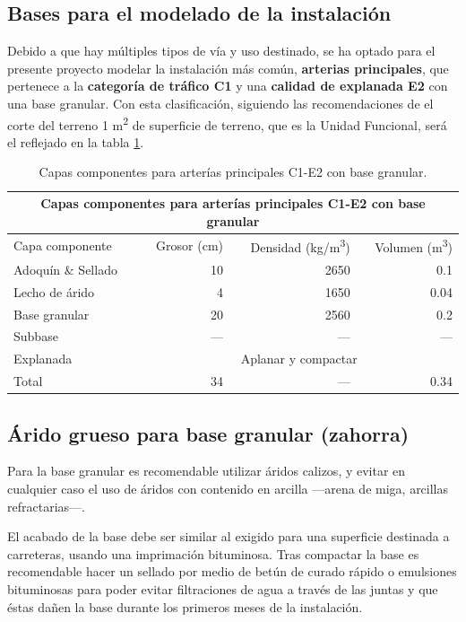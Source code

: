 \subsection{Bases para el modelado de la instalación}

Debido a que hay múltiples tipos de vía y uso destinado, se ha optado para el presente proyecto modelar la instalación más común, \textbf{arterias principales}, que pertenece a la \textbf{categoría de tráfico C1} y una \textbf{calidad de explanada E2} con una base granular. Con esta clasificación, siguiendo las recomendaciones de \cite{euroadoquinc} el corte del terreno 1 \si{m^2} de superficie de terreno, que es la Unidad Funcional, será el reflejado en la tabla \ref{cortedelterreno}.

\begin{table}[!htb]
\centering
\begin{tabular}{lrrr}
\toprule
\multicolumn{4}{c}{Capas componentes para arterías principales C1-E2 con base granular}\\
\midrule
Capa componente & Grosor (\si{cm}) & Densidad (\si{kg/m^3}) & Volumen (\si{m^3})\\
\midrule
Adoquín \& Sellado & 10 & 2650 & 0.1\\
Lecho de árido & 4 & 1650 & 0.04\\
Base granular & 20 & 2560 & 0.2\\
Subbase & — & — & —\\
Explanada & \multicolumn{3}{c}{Aplanar y compactar}\\
\midrule
Total & 34 & — & 0.34\\
\bottomrule
\end{tabular}
\caption{Capas componentes para arterías principales C1-E2 con base granular.}
\label{cortedelterreno}
\end{table}

\subsection{Árido grueso para base granular (zahorra)}

Para la base granular es recomendable utilizar áridos calizos, y evitar en cualquier caso el uso de áridos con contenido en arcilla —arena de miga, arcillas refractarias—.

El acabado de la base debe ser similar al exigido para una superficie destinada a carreteras, usando una imprimación bituminosa. Tras compactar la base es recomendable hacer un sellado por medio de betún de curado rápido o emulsiones bituminosas para poder evitar filtraciones de agua a través de las juntas y que éstas dañen la base durante los primeros meses de la instalación.

